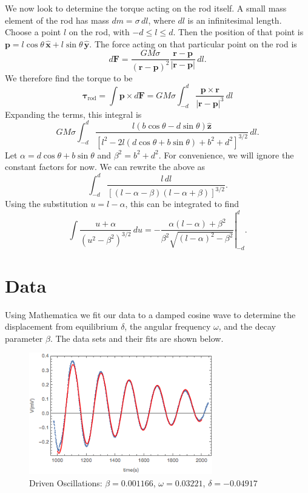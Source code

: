 \documentclass[aps, reprint,amsmath,amssymb]{revtex4-1} %
\renewcommand{\vec}[1]{\boldsymbol{#1}}
\newcommand{\x}{\vec{\hat{x}}}
\newcommand{\y}{\vec{\hat{y}}}
\newcommand{\z}{\vec{\hat{z}}}
\begin{document}
We now look to determine the torque acting on the rod itself. A small mass
element of the rod has mass $dm = \sigma\,dl$, where $dl$ is an
infinitesimal length. Choose a point $l$ on the rod, with $-d\leq l \leq
d$. Then the position of that point is $\vec{p} = l\cos\theta\,\x +
l\sin\theta\,\y$. The force acting on that particular point on the rod is
\[
    d\vec{F} = \frac{G M \sigma}{(\vec{r} - \vec{p})^2} \frac{\vec{r} -
    \vec{p}}{|\vec{r} - \vec{p}|} \, dl.
\]
We therefore find the torque to be
\begin{equation}
    \label{eq:rod_torque}
    \vec{\tau}_\text{rod} = \int \vec{p} \times d\vec{F}
    = G M \sigma \int_{-d}^d \frac{\vec{p}\times\vec{r}}{|\vec{r} -
    \vec{p}|^3} \, dl
\end{equation}
Expanding the terms, this integral is
\[
G M \sigma \int_{-d}^d \frac{l (b \cos \theta - d \sin \theta)\z}
{[l^2 - 2l (d \cos \theta + b \sin \theta) + b^2 + d^2]^{3/2}}\, dl.
\]
Let $\alpha = d \cos \theta + b \sin \theta$ and $\beta^2 = b^2 + d^2$.
For convenience, we will ignore the constant factors for now. 
We can rewrite the above as
\[
    \int_{-d}^{d} \frac{l\,dl}
    {[ (l - \alpha - \beta) (l - \alpha + \beta)]^{3/2}}.
\]
Using the substitution $u = l - \alpha$, this can be integrated to
find
\[
    \int \frac{u + \alpha}{(u^2 - \beta^2)^{3/2}}\,du
    = -\left.\frac{\alpha (l-\alpha) + \beta^2}
    {\beta^2 \sqrt{(l-\alpha)^2 - \beta^2}} \right|_{-d}^{d}.
\]


\section{Data}

Using Mathematica we fit our data to a damped cosine wave to determine the displacement from equilibrium $\delta$, the angular frequency $\omega$, and the decay parameter $\beta$. The data sets and their fits are shown below.

\begin{figure}[h!]
\centering
\caption{Driven Oscillations: $\beta = 0.001166$, $\omega = 0.03221$, $\delta=-0.04917$}

\includegraphics[width=8cm]{figs/drivenplot.png}
\end{figure}
\end{document}
